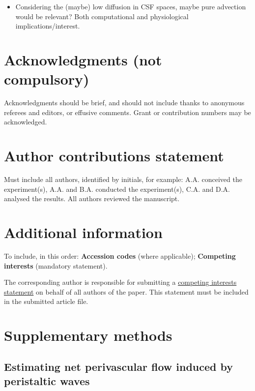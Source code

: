 \documentclass[fleqn,10pt]{wlscirep}
\begin{document}
\begin{itemize}
\item
  Considering the (maybe) low diffusion in CSF spaces, maybe pure
  advection would be relevant? Both computational and physiological
  implications/interest.
\end{itemize}



\newpage
\section*{Acknowledgments (not compulsory)}

Acknowledgments should be brief, and should not include thanks to anonymous referees and editors, or effusive comments. Grant or contribution numbers may be acknowledged.

\section*{Author contributions statement}

Must include all authors, identified by initials, for example:
A.A. conceived the experiment(s),  A.A. and B.A. conducted the experiment(s), C.A. and D.A. analysed the results.  All authors reviewed the manuscript. 

\section*{Additional information}

To include, in this order: \textbf{Accession codes} (where applicable); \textbf{Competing interests} (mandatory statement). 

The corresponding author is responsible for submitting a \href{http://www.nature.com/srep/policies/index.html#competing}{competing interests statement} on behalf of all authors of the paper. This statement must be included in the submitted article file.

\newpage
\appendix

\section{Supplementary methods}

\subsection{Estimating net perivascular flow induced by peristaltic waves}
\label{sec:sup:peristalsis}
\end{document}
